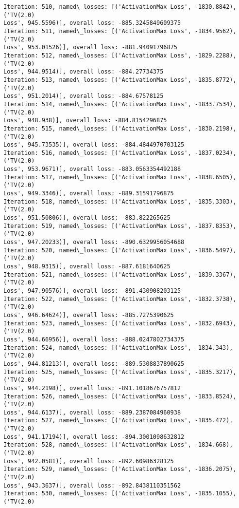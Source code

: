\documentclass[10pt]{article}
\begin{document}
\begin{Verbatim}[commandchars=\\\{\}]
Iteration: 510, named\_losses: [('ActivationMax Loss', -1830.8842), ('TV(2.0)
Loss', 945.5596)], overall loss: -885.3245849609375
Iteration: 511, named\_losses: [('ActivationMax Loss', -1834.9562), ('TV(2.0)
Loss', 953.01526)], overall loss: -881.94091796875
Iteration: 512, named\_losses: [('ActivationMax Loss', -1829.2288), ('TV(2.0)
Loss', 944.9514)], overall loss: -884.27734375
Iteration: 513, named\_losses: [('ActivationMax Loss', -1835.8772), ('TV(2.0)
Loss', 951.2014)], overall loss: -884.67578125
Iteration: 514, named\_losses: [('ActivationMax Loss', -1833.7534), ('TV(2.0)
Loss', 948.938)], overall loss: -884.8154296875
Iteration: 515, named\_losses: [('ActivationMax Loss', -1830.2198), ('TV(2.0)
Loss', 945.73535)], overall loss: -884.4844970703125
Iteration: 516, named\_losses: [('ActivationMax Loss', -1837.0234), ('TV(2.0)
Loss', 953.9671)], overall loss: -883.0563354492188
Iteration: 517, named\_losses: [('ActivationMax Loss', -1838.6505), ('TV(2.0)
Loss', 949.3346)], overall loss: -889.31591796875
Iteration: 518, named\_losses: [('ActivationMax Loss', -1835.3303), ('TV(2.0)
Loss', 951.50806)], overall loss: -883.822265625
Iteration: 519, named\_losses: [('ActivationMax Loss', -1837.8353), ('TV(2.0)
Loss', 947.20233)], overall loss: -890.6329956054688
Iteration: 520, named\_losses: [('ActivationMax Loss', -1836.5497), ('TV(2.0)
Loss', 948.9315)], overall loss: -887.6181640625
Iteration: 521, named\_losses: [('ActivationMax Loss', -1839.3367), ('TV(2.0)
Loss', 947.90576)], overall loss: -891.430908203125
Iteration: 522, named\_losses: [('ActivationMax Loss', -1832.3738), ('TV(2.0)
Loss', 946.64624)], overall loss: -885.7275390625
Iteration: 523, named\_losses: [('ActivationMax Loss', -1832.6943), ('TV(2.0)
Loss', 944.66956)], overall loss: -888.0247802734375
Iteration: 524, named\_losses: [('ActivationMax Loss', -1834.343), ('TV(2.0)
Loss', 944.81213)], overall loss: -889.5308837890625
Iteration: 525, named\_losses: [('ActivationMax Loss', -1835.3217), ('TV(2.0)
Loss', 944.2198)], overall loss: -891.1018676757812
Iteration: 526, named\_losses: [('ActivationMax Loss', -1833.8524), ('TV(2.0)
Loss', 944.6137)], overall loss: -889.2387084960938
Iteration: 527, named\_losses: [('ActivationMax Loss', -1835.472), ('TV(2.0)
Loss', 941.17194)], overall loss: -894.3001098632812
Iteration: 528, named\_losses: [('ActivationMax Loss', -1834.668), ('TV(2.0)
Loss', 942.0581)], overall loss: -892.60986328125
Iteration: 529, named\_losses: [('ActivationMax Loss', -1836.2075), ('TV(2.0)
Loss', 943.3637)], overall loss: -892.8438110351562
Iteration: 530, named\_losses: [('ActivationMax Loss', -1835.1055), ('TV(2.0)

\end{Verbatim}
\end{document}
